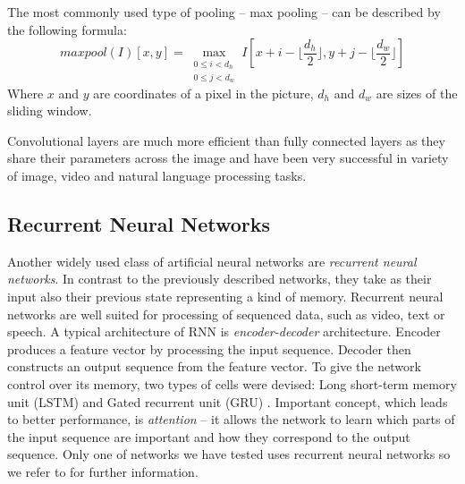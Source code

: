 The most commonly used type of pooling -- max pooling -- can be described by the following formula: 
$$maxpool(I)[x,y] =
\max_{\substack{0 \leq i < d_h\\
		0 \leq j < d_w}}
I[x + i - \lfloor \frac{d_h}{2} \rfloor, y + j - \lfloor \frac{d_w}{2}  \rfloor ] $$ Where $x$ and $y$ are coordinates of a pixel in the picture, $d_h$ and $d_w$ are sizes of the sliding window.\par
Convolutional layers are much more efficient than fully connected layers as they share their parameters across the image and have been very successful in variety of image, video and natural language processing tasks. 

\subsection{Recurrent Neural Networks}
Another widely used class of artificial neural networks are \textit{recurrent neural networks}. In contrast to the previously described networks, they take as their input also their previous state representing a kind of memory. Recurrent neural networks are well suited for processing of sequenced data, such as video, text or speech. A typical architecture of RNN is \textit{encoder-decoder} architecture. Encoder produces a feature vector by processing the input sequence. Decoder then constructs an output sequence from the feature vector. To give the network control over its memory, two types of cells were devised: Long short-term memory unit (LSTM) \cite{hochreiter_long_1997} and Gated recurrent unit (GRU) \cite{cho_learning_2014}. Important concept, which leads to better performance, is \textit{attention} \cite{bahdanau_neural_2014} -- it allows the network to learn which parts of the input sequence are important and how they correspond to the output sequence.
Only one of networks we have tested uses recurrent neural networks so we refer to \cite{goodfellow_deep_2016} for further information.

